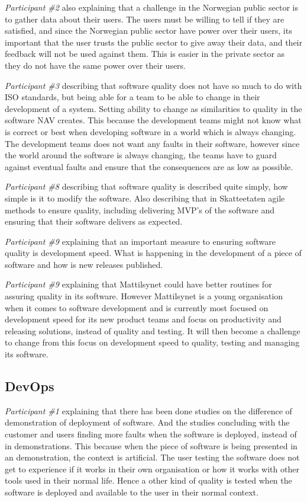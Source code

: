 \textit{Participant \#2} also explaining that a challenge in the Norwegian public sector is to gather data about their users. The users must be willing to tell if they are satisfied, and since the Norwegian public sector have power over their users, its important that the user trusts the public sector to give away their data, and their feedback will not be used against them. This is easier in the private sector as they do not have the same power over their users.

\textit{Participant \#3} describing that software quality does not have so much to do with ISO standards, but being able for a team to be able to change in their development of a system. Setting ability to change as similarities to quality in the software NAV creates. This because the development teams might not know what is correct or best when developing software in a world which is always changing. The development teams does not want any faults in their software, however since the world around the software is always changing, the teams have to guard against eventual faults and ensure that the consequences are as low as possible.

\textit{Participant \#8} describing that software quality is described quite simply, how simple is it to modify the software. Also describing that in Skatteetaten agile methods to ensure quality, including delivering MVP's of the software and ensuring that their software delivers as expected.

\textit{Participant \#9} explaining that an important measure to ensuring software quality is development speed. What is happening in the development of a piece of software and how is new releases published.

\textit{Participant \#9} explaining that Mattilsynet could have better routines for assuring quality in its software. However Mattilsynet is a young organisation when it comes to software development and is currently most focused on development speed for its new product teams and focus on productivity and releasing solutions, instead of quality and testing. It will then become a challenge to change from this focus on development speed to quality, testing and managing its software.


\subsection{DevOps}
\textit{Participant \#1} explaining that there has been done studies on the difference of demonstration of deployment of software. And the studies concluding with the customer and users finding more faults when the software is deployed, instead of in demonstrations. This because when the piece of software is being presented in an demonstration, the context is artificial. The user testing the software does not get to experience if it works in their own organisation or how it works with other tools used in their normal life. Hence a other kind of quality is tested when the software is deployed and available to the user in their normal context.

